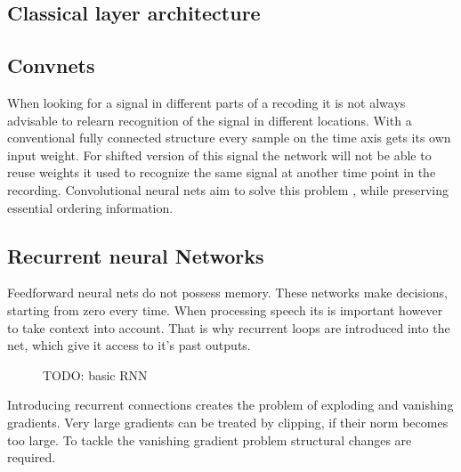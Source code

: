 \subsection{Classical layer architecture}

\subsection{Convnets}
When looking for a signal in different parts of a recoding it is not always advisable to relearn recognition
of the signal in different locations. With a conventional fully connected structure every sample on the time axis gets its own input weight. For shifted version of this signal the network will not be able to reuse weights it used
to recognize the same signal at another time point in the recording.
Convolutional neural nets aim to solve this problem \cite[page 6]{Dumoulin2016}, while preserving essential ordering information.

\subsection{Recurrent neural Networks}
Feedforward neural nets do not possess memory. These networks make decisions, starting from zero every time. When processing speech its is important however to take context into account. That is why recurrent loops are introduced into the net, which give it access to it's past outputs.
\begin{figure}
\caption{TODO: basic RNN}
\end{figure}
Introducing recurrent connections creates the problem of exploding and vanishing gradients. Very large gradients can be treated by clipping, if their norm becomes too large. To tackle the vanishing gradient problem structural changes are required.

